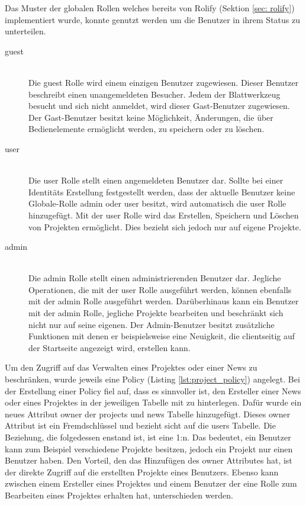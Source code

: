 Das Muster der globalen Rollen welches bereits von Rolify (Sektion \ref{sec: rolify}) implementiert wurde, konnte genutzt werden um die Benutzer in ihrem Status zu unterteilen. 

\begin{description}
	\item[guest]\hfill\\
	Die guest Rolle wird einem einzigen Benutzer zugewiesen. Dieser Benutzer beschreibt einen unangemeldeten Besucher. Jedem der Blattwerkzeug besucht und sich nicht anmeldet, wird dieser Gast-Benutzer zugewiesen. Der Gast-Benutzer besitzt keine Möglichkeit, Änderungen, die über Bedienelemente ermöglicht werden, zu speichern oder zu löschen.
	\item[user]\hfill\\
	Die user Rolle stellt einen angemeldeten Benutzer dar. Sollte bei einer Identitäts Erstellung festgestellt werden, dass der aktuelle Benutzer keine Globale-Rolle admin oder user besitzt, wird automatisch die user Rolle hinzugefügt. Mit der user Rolle wird das Erstellen, Speichern und Löschen von Projekten ermöglicht. Dies bezieht sich jedoch nur auf eigene Projekte.
	\item[admin]\hfill\\
	Die admin Rolle stellt einen administrierenden Benutzer dar. Jegliche Operationen, die mit der user Rolle ausgeführt werden, können ebenfalls mit der admin Rolle ausgeführt werden. Darüberhinaus kann ein Benutzer mit der admin Rolle, jegliche Projekte bearbeiten und beschränkt sich nicht nur auf seine eigenen. Der Admin-Benutzer besitzt zusätzliche Funktionen mit denen er beispielsweise eine Neuigkeit, die clientseitig auf der Startseite angezeigt wird, erstellen kann.
\end{description}

Um den Zugriff auf das Verwalten eines Projektes oder einer News zu beschränken, wurde jeweils eine Policy (Listing \ref{lst:project_policy}) angelegt. Bei der Erstellung einer Policy fiel auf, dass es sinnvoller ist, den Ersteller einer News oder eines Projektes in der jeweiligen Tabelle mit zu hinterlegen. Dafür wurde ein neues Attribut owner der projects und news Tabelle hinzugefügt. Dieses owner Attribut ist ein Fremdschlüssel und bezieht sicht auf die users Tabelle. Die Beziehung, die folgedessen enstand ist, ist eine 1:n. Das bedeutet, ein Benutzer kann zum Beispiel verschiedene Projekte besitzen, jedoch ein Projekt nur einen Benutzer haben. Den Vorteil, den das Hinzufügen des owner Attributes hat, ist der direkte Zugriff auf die erstellten Projekte eines Benutzers. Ebenso kann zwischen einem Ersteller eines Projektes und einem Benutzer der eine Rolle zum Bearbeiten eines Projektes erhalten hat, unterschieden werden.

